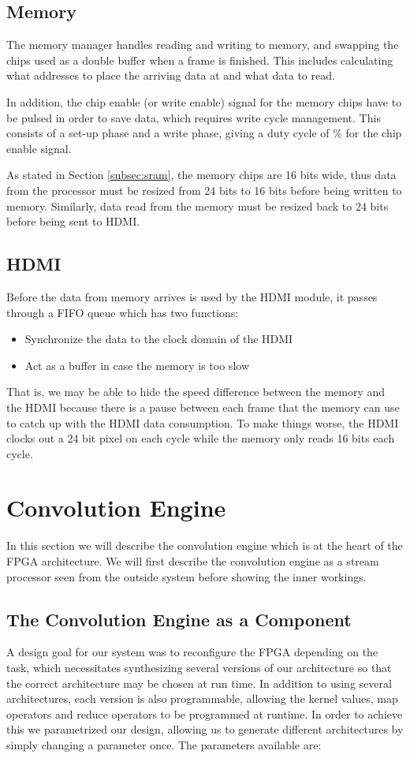 \subsection{Memory}
The memory manager handles reading and writing to memory, and swapping the chips used as a double buffer when a frame is finished.
This includes calculating what addresses to place the arriving data at and what data to read.

In addition, the chip enable (or write enable) signal for the memory chips have to be pulsed in order to save data, which requires write cycle management.
This consists of a set-up phase and a write phase, giving a duty cycle of \unit[50]{\%} for the chip enable signal.

As stated in Section \ref{subsec:sram}, the memory chips are 16 bits wide, thus data from the processor must be resized from 24 bits to 16 bits before being written to memory.
Similarly, data read from the memory must be resized back to 24 bits before being sent to HDMI.

\subsection{HDMI}
Before the data from memory arrives is used by the HDMI module, it passes through a FIFO queue which has two functions:
\begin{itemize}
    \item Synchronize the data to the clock domain of the HDMI
    \item Act as a buffer in case the memory is too slow
\end{itemize}

That is, we may be able to hide the speed difference between the memory and the HDMI because there is a pause between each frame that the memory can use to catch up with the HDMI data consumption.
To make things worse, the HDMI clocks out a 24 bit pixel on each cycle while the memory only reads 16 bits each cycle.

\section{Convolution Engine}
\label{sec:processor}
In this section we will describe the convolution engine which is at the heart of the FPGA architecture.
We will first describe the convolution engine as a stream processor seen from the outside system before showing the inner workings.

\subsection{The Convolution Engine as a Component}
A design goal for our system was to reconfigure the FPGA depending on the task, which necessitates synthesizing several versions of our architecture so that the correct architecture may be chosen at run time.
In addition to using several architectures, each version is also programmable, allowing the kernel values, map operators and reduce operators to be programmed at runtime.
In order to achieve this we parametrized our design, allowing us to generate different architectures by simply changing a parameter once.
The parameters available are:

